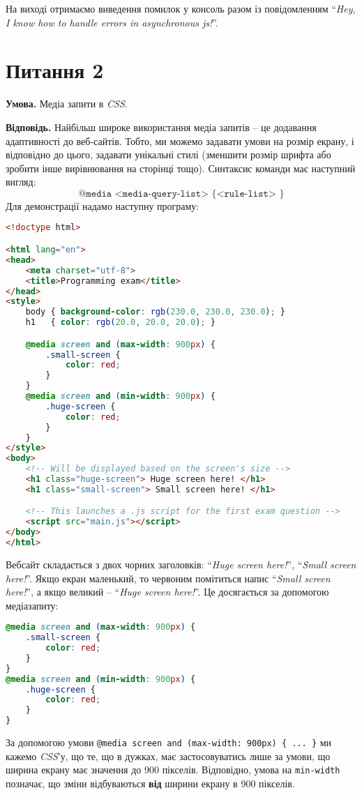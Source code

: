 \documentclass[12pt]{extarticle}
\begin{document}
На виході отримаємо виведення помилок у консоль разом із повідомленням ``\textit{Hey, I know how to handle errors in asynchronous js!}''.  

\section*{Питання 2}

\textbf{Умова.} Медіа запити в \textit{CSS}.

\textbf{Відповідь.} Найбільш широке використання медіа запитів -- це додавання адаптивності до веб-сайтів. Тобто, ми можемо задавати умови на розмір екрану, і відповідно до цього, задавати унікальні стилі (зменшити розмір шрифта або зробити інше вирівнювання на сторінці тощо). Синтаксис команди має наступний вигляд:
\[
\texttt{@media <media-query-list> \{ <rule-list> \}}
\]
Для демонстрації надамо наступну програму:
\begin{lstlisting}[language=html, caption=Повна \texttt{html} сторінка з використанням \texttt{@media} запитів]
<!doctype html>

<html lang="en">
<head>
    <meta charset="utf-8">
    <title>Programming exam</title>
</head>
<style>
    body { background-color: rgb(230.0, 230.0, 230.0); }
    h1   { color: rgb(20.0, 20.0, 20.0); }

    @media screen and (max-width: 900px) {
        .small-screen {
            color: red;
        }
    }
    @media screen and (min-width: 900px) {
        .huge-screen {
            color: red;
        }
    }
</style>
<body>
    <!-- Will be displayed based on the screen's size -->
    <h1 class="huge-screen"> Huge screen here! </h1>
    <h1 class="small-screen"> Small screen here! </h1>

    <!-- This launches a .js script for the first exam question -->
    <script src="main.js"></script>
</body>
</html>
\end{lstlisting}

Вебсайт складається з двох чорних заголовків: ``\textit{Huge screen here!}'', ``\textit{Small screen here!}''. Якщо екран маленький, то червоним помітиться напис ``\textit{Small screen here!}'', а якщо великий -- ``\textit{Huge screen here!}''. Це досягається за допомогою медіазапиту:
\begin{lstlisting}[language=css, caption=Використання \texttt{@media} запитів]
@media screen and (max-width: 900px) {
    .small-screen {
        color: red;
    }
}
@media screen and (min-width: 900px) {
    .huge-screen {
        color: red;
    }
}
\end{lstlisting}

За допомогою умови \texttt{@media screen and (max-width: 900px) \{ ... \}} ми кажемо \textit{CSS}'у, що те, що в дужках, має застосовуватись лише за умови, що ширина екрану має значення до 900 пікселів. Відповідно, умова на \texttt{min-width} позначає, що зміни відбуваються \textbf{від} ширини екрану в 900 пікселів. 
\end{document}
